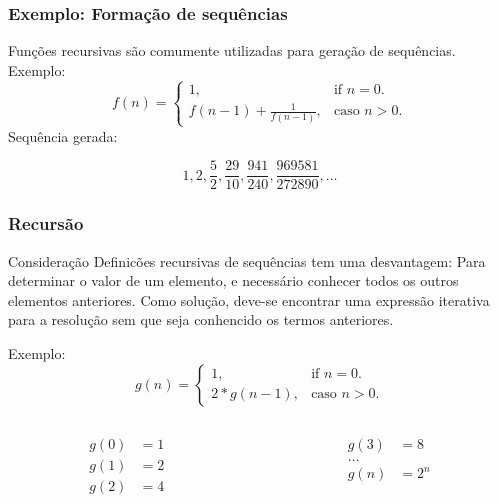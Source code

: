 \documentclass[10pt, handout]{beamer}
\begin{document}
\begin{frame}
  \frametitle{Exemplo: Formação de sequências}
  Funções recursivas são comumente utilizadas para geração de sequências. Exemplo:
  \begin{equation}
    f(n)=\begin{cases}
      1,                         & \text{if $n=0$}.     \\
      f(n-1) + \frac{1}{f(n-1)}, & \text{caso $n > 0$}.
    \end{cases}
  \end{equation}
  \pause
  Sequência gerada:

  $$1, 2, \frac{5}{2}, \frac{29}{10}, \frac{941}{240}, \frac{969581}{272890}, \ldots$$
\end{frame}

\begin{frame}
  \frametitle{Recursão}
  \begin{block}{Consideração}
    Definicões recursivas de sequências tem uma desvantagem: Para determinar o valor de um elemento, e necessário conhecer todos os outros elementos anteriores. Como solução, deve-se encontrar uma expressão iterativa para a resolução sem que seja conhencido os termos anteriores.
  \end{block}
  Exemplo:
  \begin{equation}
    g(n)=\begin{cases}
      1,        & \text{if $n=0$}.     \\
      2*g(n-1), & \text{caso $n > 0$}.
    \end{cases}
  \end{equation}
  \begin{columns}[t]
    \begin{column}{4cm}
      \begin{align*}
        g(0) & = 1 \\
        g(1) & = 2 \\
        g(2) & = 4
      \end{align*}
    \end{column}
    \begin{column}{4cm}
      \begin{align*}
        g(3)   & = 8   \\
        \ldots &       \\
        g(n)   & = 2^n
      \end{align*}
    \end{column}
  \end{columns}
  \vfill
\end{frame}
\end{document}

